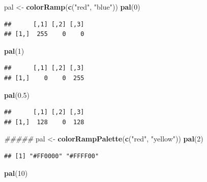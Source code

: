 \documentclass[]{book}
\newenvironment{Shaded}{\begin{snugshade}}{\end{snugshade}}
\newcommand{\CommentTok}[1]{\textcolor[rgb]{0.56,0.35,0.01}{\textit{#1}}}
\newcommand{\DecValTok}[1]{\textcolor[rgb]{0.00,0.00,0.81}{#1}}
\newcommand{\FloatTok}[1]{\textcolor[rgb]{0.00,0.00,0.81}{#1}}
\newcommand{\KeywordTok}[1]{\textcolor[rgb]{0.13,0.29,0.53}{\textbf{#1}}}
\newcommand{\NormalTok}[1]{#1}
\newcommand{\StringTok}[1]{\textcolor[rgb]{0.31,0.60,0.02}{#1}}
\begin{document}
\begin{Shaded}
\begin{Highlighting}[]
\NormalTok{pal <-}\StringTok{ }\KeywordTok{colorRamp}\NormalTok{(}\KeywordTok{c}\NormalTok{(}\StringTok{"red"}\NormalTok{, }\StringTok{"blue"}\NormalTok{))}
\KeywordTok{pal}\NormalTok{(}\DecValTok{0}\NormalTok{)}
\end{Highlighting}
\end{Shaded}

\begin{verbatim}
##      [,1] [,2] [,3]
## [1,]  255    0    0
\end{verbatim}

\begin{Shaded}
\begin{Highlighting}[]
\KeywordTok{pal}\NormalTok{(}\DecValTok{1}\NormalTok{)}
\end{Highlighting}
\end{Shaded}

\begin{verbatim}
##      [,1] [,2] [,3]
## [1,]    0    0  255
\end{verbatim}

\begin{Shaded}
\begin{Highlighting}[]
\KeywordTok{pal}\NormalTok{(}\FloatTok{0.5}\NormalTok{)}
\end{Highlighting}
\end{Shaded}

\begin{verbatim}
##      [,1] [,2] [,3]
## [1,]  128    0  128
\end{verbatim}

\begin{Shaded}
\begin{Highlighting}[]
\CommentTok{#####}
\NormalTok{pal <-}\StringTok{ }\KeywordTok{colorRampPalette}\NormalTok{(}\KeywordTok{c}\NormalTok{(}\StringTok{"red"}\NormalTok{, }\StringTok{"yellow"}\NormalTok{))}
\KeywordTok{pal}\NormalTok{(}\DecValTok{2}\NormalTok{)}
\end{Highlighting}
\end{Shaded}

\begin{verbatim}
## [1] "#FF0000" "#FFFF00"
\end{verbatim}

\begin{Shaded}
\begin{Highlighting}[]
\KeywordTok{pal}\NormalTok{(}\DecValTok{10}\NormalTok{)}
\end{Highlighting}
\end{Shaded}
\end{document}
